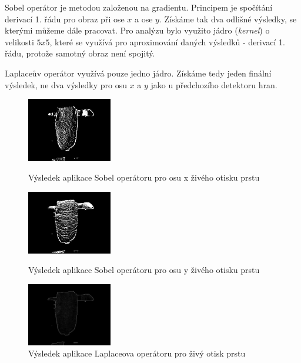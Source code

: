 Sobel operátor je metodou založenou na gradientu. Principem je spočítání derivací 1. řádu pro obraz při ose $x$ a ose $y$. Získáme tak dva odlišné výsledky, se kterými můžeme dále pracovat. Pro analýzu bylo využito jádro (\textit{kernel}) o velikosti $5x5$, které se využívá pro aproximování daných výsledků - derivací 1. řádu, protože samotný obraz není spojitý. 

Laplaceův operátor využívá pouze jedno jádro. Získáme tedy jeden finální výsledek, ne dva výsledky pro osu $x$ a $y$ jako u předchozího detektoru hran. \cite{SobelLaplacianDetectors}

\begin{figure}[!htbp]
  \begin{minipage}[b]{0.3\linewidth}
    \centering
    \includegraphics[width=140px]{obrazky-figures/sobelxlive.png}
    \caption{Výsledek aplikace Sobel operátoru pro osu x živého otisku prstu}
  \end{minipage}
  \hspace{0.3cm}
  \begin{minipage}[b]{0.3\linewidth}
    \centering
    \includegraphics[width=140px]{obrazky-figures/sobelylive.png}
    \caption{Výsledek aplikace Sobel operátoru pro osu y živého otisku prstu}
  \end{minipage}
  \hspace{0.3cm}
    \begin{minipage}[b]{0.3\linewidth}
    \centering
    \includegraphics[width=140px]{obrazky-figures/laplacianlive.png}
    \caption{Výsledek aplikace Laplaceova operátoru pro živý otisk prstu}
  \end{minipage}
\end{figure}


